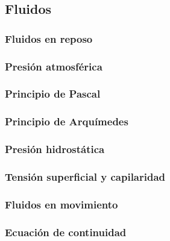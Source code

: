 \subsection{Fluidos}
\subsubsection{Fluidos en reposo}
\subsubsection{Presión atmosférica}
\subsubsection{Principio de Pascal}
\subsubsection{Principio de Arquímedes}
\subsubsection{Presión hidrostática}
\subsubsection{Tensión superficial y capilaridad}
\subsubsection{Fluidos en movimiento}
\subsubsection{Ecuación de continuidad}